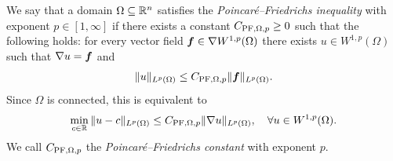 \documentclass[10pt,letterpaper]{article}
\begin{document}

We say that a domain $\Omega \subseteq {\mathbb R}^{n}$ satisfies the \emph{Poincar\'e--Friedrichs inequality} with exponent $p \in [1,\infty]$
if there exists a constant $C_{{\rm PF},\Omega,p} \geq 0$ such that the following holds:
for every vector field $\bm{f} \in \nabla W^{1,p}(\Omega)$ there exists $u \in W^{1,p}(\Omega)$
such that $\nabla u = \bm{f}$ and 
\begin{align}\label{math:inequalitypf:gradient}
    \| u \|_{L^{p}(\Omega)}
    \leq 
    C_{{\rm PF},\Omega,p} 
    \| \bm{f} \|_{L^{p}(\Omega)}
    .
\end{align}
Since $\Omega$ is connected, this is equivalent to  
\begin{align*}
    \min_{ c \in {\mathbb R} } \| u - c \|_{L^{p}(\Omega)}
    \leq 
    C_{{\rm PF},\Omega,p} 
    \| \nabla u \|_{L^{p}(\Omega)},
    \quad 
    \forall 
    u \in W^{1,p}(\Omega)
    .
\end{align*}
We call $C_{{\rm PF},\Omega,p}$ the \emph{Poincar\'e--Friedrichs constant} with exponent $p$. 
\\
\end{document}

